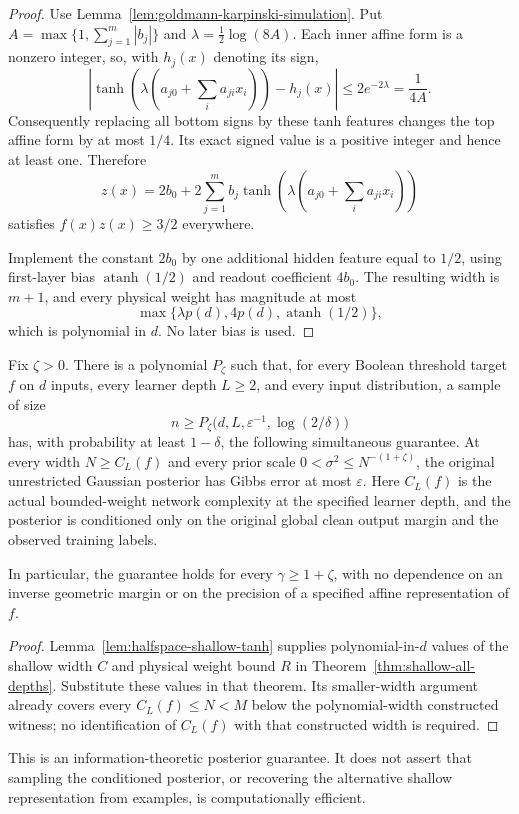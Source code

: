 \begin{proof}
Use Lemma~\ref{lem:goldmann-karpinski-simulation}. Put
$A=\max\{1,\sum_{j=1}^m|b_j|\}$ and
$\lambda=\tfrac12\log(8A)$. Each inner affine form is a nonzero
integer, so, with $h_j(x)$ denoting its sign,
\[
 \left|\tanh\!\left(\lambda
      \left(a_{j0}+\sum_i a_{ji}x_i\right)\right)-h_j(x)\right|
       \le 2e^{-2\lambda}=\frac1{4A}.
\]
Consequently replacing all bottom signs by these tanh features changes
the top affine form by at most $1/4$. Its exact signed value is a
positive integer and hence at least one. Therefore
\[
 z(x)=2b_0+2\sum_{j=1}^m b_j
       \tanh\!\left(\lambda
       \left(a_{j0}+\sum_i a_{ji}x_i\right)\right)
\]
satisfies $f(x)z(x)\ge3/2$ everywhere.

Implement the constant $2b_0$ by one additional hidden feature equal
to $1/2$, using first-layer bias $\operatorname{atanh}(1/2)$ and
readout coefficient $4b_0$. The resulting width is $m+1$, and every
physical weight has magnitude at most
\[
 \max\{\lambda p(d),4p(d),\operatorname{atanh}(1/2)\},
\]
which is polynomial in $d$. No later bias is used.
\end{proof}

\begin{theorem}
\label{thm:halfspace-unrestricted-all-depths}
Fix $\zeta>0$. There is a polynomial $P_\zeta$ such that, for every
Boolean threshold target $f$ on $d$ inputs, every learner depth
$L\ge2$, and every input distribution, a sample of size
\[
 n\ge P_\zeta\bigl(d,L,\varepsilon^{-1},\log(2/\delta)\bigr)
\]
has, with probability at least $1-\delta$, the following simultaneous
guarantee. At every width $N\ge C_L(f)$ and every prior scale
$0<\sigma^2\le N^{-(1+\zeta)}$, the original unrestricted Gaussian
posterior has Gibbs error at most $\varepsilon$. Here $C_L(f)$ is
the actual bounded-weight network complexity at the specified learner
depth, and the posterior is conditioned only on the original global
clean output margin and the observed training labels.

In particular, the guarantee holds for every $\gamma\ge1+\zeta$,
with no dependence on an inverse geometric margin or on the precision
of a specified affine representation of $f$.
\end{theorem}

\begin{proof}
Lemma~\ref{lem:halfspace-shallow-tanh} supplies polynomial-in-$d$
values of the shallow width $C$ and physical weight bound $R$ in
Theorem~\ref{thm:shallow-all-depths}. Substitute these values in that
theorem. Its smaller-width argument already covers every
$C_L(f)\le N<M$ below the polynomial-width constructed witness; no
identification of $C_L(f)$ with that constructed width is required.
\end{proof}

This is an information-theoretic posterior guarantee. It does not
assert that sampling the conditioned posterior, or recovering the
alternative shallow representation from examples, is computationally
efficient.
